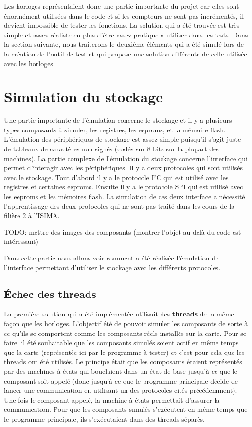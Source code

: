 \documentclass[a4paper]{article}
\begin{document}
Les horloges représentaient donc une partie importante du projet car elles sont
énormément utilisées dans le code et si les compteurs ne sont pas incrémentés,
il devient impossible de tester les fonctions. La solution qui a été trouvée est
très simple et assez réaliste en plus d'être assez pratique à utiliser dans les
tests. Dans la section suivante, nous traiterons le deuxième éléments qui a été
simulé lors de la création de l'outil de test et qui propose une solution
différente de celle utilisée avec les horloges.
\section{Simulation du stockage}%

Une partie importante de l'émulation concerne le stockage et il y a plusieurs
types composants à simuler, les registres, les eeproms, et la mémoire flash.
L'émulation des périphériques de stockage est assez simple puisqu'il s'agit
juste de tableaux de caractères non signés (codés sur 8 bits sur la plupart des
machines). La partie complexe de l'émulation du stockage concerne l'interface
qui permet d'interagir avec les périphériques. Il y a deux protocoles qui sont
utilisés avec le stockage. Tout d'abord il y a le protocole I²C qui est utilisé
avec les registres et certaines eeproms. Ensuite il y a le protocole SPI qui est
utilisé avec les eeproms et les mémoires flash. La simulation de ces deux
interface a nécessité l'apprentissage des deux protocoles qui ne sont pas traité
dans les cours de la filière 2 à l'ISIMA.

TODO: mettre des images des composants (montrer l'objet au delà du code est
intéressant)

Dans cette partie nous allons voir comment a été réalisée l'émulation de
l'interface permettant d'utiliser le stockage avec les différents protocoles.

\subsection{Échec des threads}%
\label{echecthread}

La première solution qui a été implémentée utilisait des \textbf{threads} de la
même façon que les horloges. L'objectif été de pouvoir simuler les composants de
sorte à ce qu'ils se comportent comme les composants réels installés sur la
carte. Pour se faire, il été souhaitable que les composants simulés soient actif
en même temps que la carte (représentée ici par le programme à tester) et c'est
pour cela que les threads ont été utilisés. Le principe était que les composants
étaient représentés par des machines à états qui bouclaient dans un état de base
jusqu'à ce que le composant soit appelé (donc jusqu'à ce que le programme
principale décide de lancer une communication en utilisant un des protocoles
cités précédemment). Une fois le composant appelé, la machine à états permettait
d'assurer la communication. Pour que les composants simulés s'exécutent en même
temps que le programme principale, ils s'exécutaient dans des threads séparés.
\\
\end{document}

